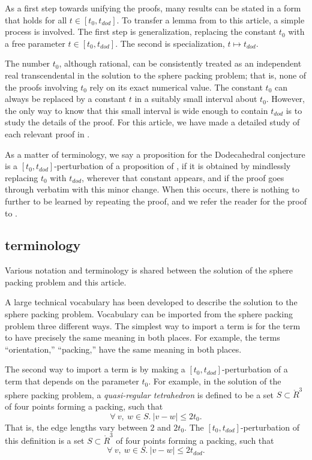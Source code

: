  As a first step towards unifying the proofs,
 many results can be stated in a form that holds for all $t\in[t_0,t_{dod}]$.
To transfer a lemma from \cite{DCG} to this article, a simple process is
involved.  The first step is generalization, replacing the constant $t_0$
with a free parameter $t\in[t_0,t_{dod}]$.  The second is specialization,
$t\mapsto t_{dod}$.  

The number $t_0$, although rational, 
can be consistently treated as an independent real transcendental 
in the solution to the sphere packing problem; that is,
none of the proofs involving $t_0$ rely on its exact numerical value.
The constant $t_0$ can always be replaced by a constant $t$
in a suitably small interval about $t_0$.  However, the only way to
know that this small interval is wide enough to contain $t_{dod}$ is to study the
details of the proof.  For this article, 
we have made a detailed study of each relevant proof in \cite{DCG}.

As a matter of terminology, we say a proposition for the Dodecahedral conjecture
is a $[t_0,t_{dod}]$-perturbation of a proposition of \cite{DCG},
if it is obtained by mindlessly replacing $t_0$ with $t_{dod}$, wherever that constant appears, and if the proof goes through verbatim with this minor change.
When this occurs, 
there is nothing to further to be learned by repeating the proof,
and we refer the reader  for the proof to \cite{DCG}.

\subsection{terminology}

Various notation and terminology is shared between the solution
of the sphere packing problem and this article.  

A large technical vocabulary has been developed 
to describe the solution to the sphere packing problem.  
Vocabulary can be imported from the sphere packing problem three
different ways.  The simplest way to import a term is for the
term to have precisely the same meaning in both places.  For
example, the terms ``orientation,'' ``packing,'' have the
same meaning in both places. 

The second way to import a term is by making a $[t_0,t_{dod}]$-perturbation of a term that depends on the parameter $t_0$.  For example,
in the solution of the sphere packing problem, a {\it quasi-regular
tetrahedron} is defined to be a set $S\subset\ring{R}^3$ of four
points forming a packing, such that
   $$
   \forall\ v,\ w \in S.\ |v - w| \le 2t_0.
   $$
That is, the edge lengths vary between $2$ and $2t_0$.
The $[t_0,t_{dod}]$-perturbation of this definition is a set $S\subset\ring{R}^3$
of four points forming a packing, such that
   $$
   \forall\ v,\ w \in S.\ |v - w| \le 2t_{dod}.
   $$

